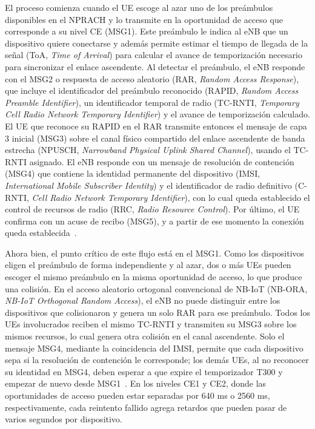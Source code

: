 El proceso comienza cuando el UE escoge al azar
uno de los preámbulos disponibles en el NPRACH y lo transmite en la oportunidad de acceso que
corresponde a su nivel CE (MSG1). Este preámbulo le indica al eNB que un dispositivo quiere
conectarse y además permite estimar el tiempo de llegada de la señal (ToA,
\textit{Time of Arrival}) para calcular el avance de temporización necesario para sincronizar
el enlace ascendente. Al detectar el preámbulo, el eNB responde con el
MSG2 o respuesta de acceso aleatorio (RAR, \textit{Random Access Response}), que
incluye el identificador del preámbulo reconocido (RAPID, \textit{Random Access Preamble
Identifier}), un identificador temporal de radio (TC-RNTI, \textit{Temporary Cell Radio
Network Temporary Identifier}) y el avance de temporización calculado. El UE que reconoce su
RAPID en el RAR transmite entonces el mensaje de capa 3 inicial (MSG3) sobre el
canal físico compartido del enlace ascendente de banda estrecha (NPUSCH, \textit{Narrowband
Physical Uplink Shared Channel}), usando el TC-RNTI asignado. El eNB responde con un
mensaje de resolución de contención (MSG4) que contiene la identidad permanente del
dispositivo (IMSI, \textit{International Mobile Subscriber Identity}) y el identificador de
radio definitivo (C-RNTI, \textit{Cell Radio Network Temporary Identifier}), con lo cual queda
establecido el control de recursos de radio (RRC, \textit{Radio Resource Control}).
Por último, el UE confirma con un
acuse de recibo (MSG5), y a partir de ese momento la conexión queda
establecida~\cite{ref4}.

Ahora bien, el punto crítico de este flujo está en el MSG1. Como los dispositivos eligen el
preámbulo de forma independiente y al azar, dos o más UEs pueden escoger el mismo preámbulo
en la misma oportunidad de acceso, lo que produce una colisión. En el acceso aleatorio
ortogonal convencional de NB-IoT (NB-ORA, \textit{NB-IoT Orthogonal Random Access}), el
eNB no puede distinguir entre los dispositivos que colisionaron y genera un solo
RAR para ese preámbulo. Todos los UEs involucrados reciben el mismo TC-RNTI y transmiten su
MSG3 sobre los mismos recursos, lo cual genera otra colisión en el canal ascendente. Solo el
mensaje MSG4, mediante la coincidencia del IMSI, permite que cada dispositivo sepa si la
resolución de contención le corresponde; los demás UEs, al no reconocer su identidad en MSG4,
deben esperar a que expire el temporizador T300 y empezar de nuevo desde MSG1~\cite{ref5,
ref4}. En los niveles CE1 y CE2, donde las oportunidades de acceso pueden estar separadas por
640 ms o 2560 ms, respectivamente, cada reintento fallido agrega retardos que pueden pasar de
varios segundos por dispositivo.

